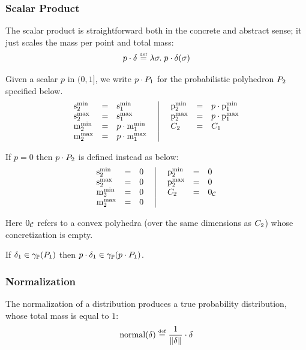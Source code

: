 \subsubsection{Scalar Product}
The scalar product is straightforward both in the concrete and
abstract sense; it just scales the mass per point and total mass:
$$ p \cdot \delta \stackrel{\smash{\scriptscriptstyle \mathrm{def}}}= \lambda \sigma . \; p \cdot \delta(\sigma) $$

\begin{definition}
Given a scalar $p$ in $(0,1]$, we write $p \cdot P_{1}$ for the probabilistic polyhedron $P_{2}$ specified below.
\[
\begin{array}{lcl@{\hspace{0.5cm}}|@{\hspace{0.5cm}}lcl}
\smin{2} &=& \smin{1} & \pmin{2} &=& p \cdot \pmin{1} \\
\smax{2} &=& \smax{1} & \pmax{2} &=& p \cdot \pmax{1} \\
\mmin{2} &=& p \cdot \mmin{1} & \getpoly{2} &=& \getpoly{1}\\
\mmax{2} &=& p \cdot \mmax{1} 
\end{array}
\]

If $ p = 0 $ then $ p \cdot P_{2} $ is defined instead as below:
\[
\begin{array}{lcl@{\hspace{0.5cm}}|@{\hspace{0.5cm}}lcl}
\smin{2} &=& 0 & \pmin{2} &=& 0 \\
\smax{2} &=& 0 & \pmax{2} &=& 0 \\
\mmin{2} &=& 0 & \getpoly{2} &=& \pzero \\
\mmax{2} &=& 0 
\end{array}
\]
\end{definition}
Here $ 0_{\mathcal{C}} $ refers to a convex polyhedra (over the same dimensions
as $ C_{2} $) whose concretization is empty.

\begin{lemma}
\label{lem:pp:scalar-prod}
If $\delta_1 \in \gamma_{\mathbb{P}}(P_{1})$ then $p \cdot \delta_1 \in \gamma_{\mathbb{P}}(p \cdot P_{1})$.
\end{lemma}

\subsubsection{Normalization}
The normalization of a distribution produces a true probability
distribution, whose total mass is equal to $ 1 $:
$$ \text{normal}(\delta) \stackrel{\smash{\scriptscriptstyle \mathrm{def}}}= \frac{1}{\mathord{\parallel}\delta\mathord{\parallel}} \cdot \delta $$

